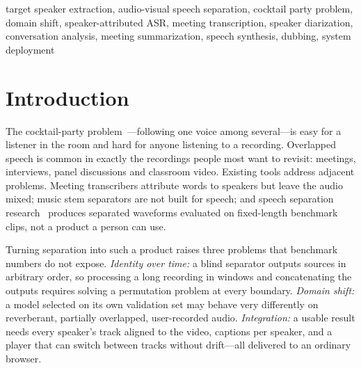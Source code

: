 \documentclass[conference]{IEEEtran}
\begin{document}
\begin{IEEEkeywords}
target speaker extraction, audio-visual speech separation, cocktail party problem, domain shift, speaker-attributed ASR, meeting transcription, speaker diarization, conversation analysis, meeting summarization, speech synthesis, dubbing, system deployment
\end{IEEEkeywords}

\section{Introduction}

The cocktail-party problem~\cite{cherry1953}---following one voice among several---is easy for a listener in the room and hard for anyone listening to a recording. Overlapped speech is common in exactly the recordings people most want to revisit: meetings, interviews, panel discussions and classroom video. Existing tools address adjacent problems. Meeting transcribers attribute words to speakers but leave the audio mixed; music stem separators are not built for speech; and speech separation research~\cite{hershey2016deep,yu2017pit,luo2019convtasnet,subakan2021sepformer,wang2023tfgridnet} produces separated waveforms evaluated on fixed-length benchmark clips, not a product a person can use.

Turning separation into such a product raises three problems that benchmark numbers do not expose. \emph{Identity over time:} a blind separator outputs sources in arbitrary order, so processing a long recording in windows and concatenating the outputs requires solving a permutation problem at every boundary. \emph{Domain shift:} a model selected on its own validation set may behave very differently on reverberant, partially overlapped, user-recorded audio. \emph{Integration:} a usable result needs every speaker's track aligned to the video, captions per speaker, and a player that can switch between tracks without drift---all delivered to an ordinary browser.
\end{document}
